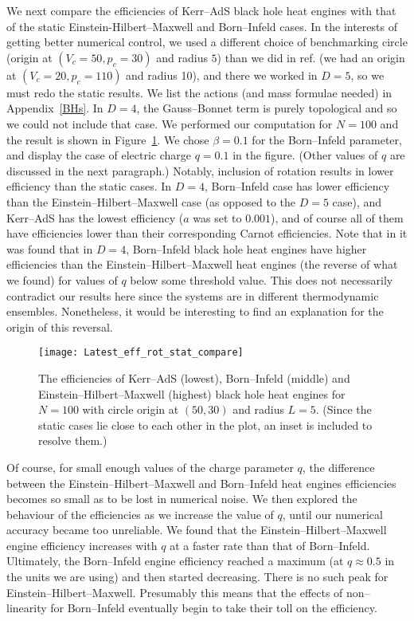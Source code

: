 \documentclass[letterpaper,11pt]{article}
\begin{document}
We next compare the efficiencies of Kerr--AdS black hole heat engines with that of the static Einstein-Hilbert--Maxwell and Born--Infeld cases.  In the interests of getting better numerical control, we used a  different  choice of benchmarking  circle (origin at $(V_c=50,p_c=30)$ and radius $5$) than we did in ref. \cite{Chakraborty:2016ssb} (we had an origin at $(V_c=20,p_c=110)$ and radius 10), and there we worked in $D=5$, so we must redo the static results.  We list the actions (and mass formulae needed)  in Appendix~\ref{BHs}. In $D=4$, the Gauss--Bonnet term is purely topological and so we could  not include that  case. We performed our computation for $N=100$ and the result is shown in Figure~\ref{fig:compare}.  We chose $\beta=0.1$ for the Born--Infeld parameter, and display the case of electric charge $q=0.1$ in the figure. (Other values of $q$ are discussed in the next paragraph.)  Notably,  inclusion of rotation results in lower efficiency than the static cases. In $D=4$,  Born--Infeld case has lower efficiency than the Einstein--Hilbert--Maxwell case (as opposed to the $D=5$ case), and Kerr--AdS has the lowest efficiency ($a$ was set to $0.001$), and of course all of them have efficiencies lower than their corresponding Carnot efficiencies. Note that in \cite{Hennigar:2017apu} it was   found that in $D=4$, Born--Infeld black hole heat engines have higher efficiencies than the Einstein--Hilbert--Maxwell heat engines (the reverse of what we found) for values of $q$ below some threshold value. This does not necessarily contradict our results here since the systems are in  different thermodynamic ensembles. Nonetheless, it would be interesting to find an explanation for the origin of this reversal.  
\begin{figure}[h]
\begin{center}
{\centering
\texttt{[image: Latest\_eff\_rot\_stat\_compare]} 
   \caption{\footnotesize   The efficiencies of Kerr--AdS (lowest), Born--Infeld (middle) and Einstein--Hilbert--Maxwell (highest) black hole heat engines for $N=100$ with circle origin at $(50,30)$ and radius $L=5$. (Since the static cases lie close to each other in the plot, an inset is included to resolve them.)}   \label{fig:compare}
}
   \end{center}
\end{figure}

 Of course, for small enough values of the charge parameter $q$, the difference between the  Einstein--Hilbert--Maxwell and Born--Infeld heat engines  efficiencies  becomes so small as to be lost in numerical noise. We  then explored the behaviour of the efficiencies as we increase the value of $q$, until our numerical accuracy became too unreliable. We found that the  Einstein--Hilbert--Maxwell engine efficiency increases with $q$ at a faster rate than that of Born--Infeld. Ultimately, the  Born--Infeld engine efficiency reached a maximum  (at $q\approx0.5$ in the units we are using) and then started decreasing. There is no such peak for Einstein--Hilbert--Maxwell. Presumably this means that  the effects of non--linearity for Born--Infeld eventually begin to take their toll on the efficiency.
 
\end{document}
